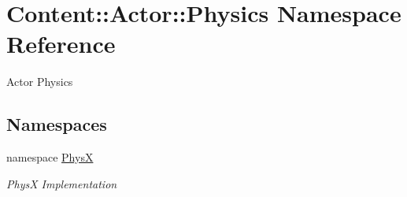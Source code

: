\hypertarget{namespaceContent_1_1Actor_1_1Physics}{
\section{Content::Actor::Physics Namespace Reference}
\label{namespaceContent_1_1Actor_1_1Physics}
}


Actor Physics  
\subsection*{Namespaces}
\begin{DoxyCompactItemize}
\item 
namespace \hyperlink{namespaceContent_1_1Actor_1_1Physics_1_1PhysX}{PhysX}


\begin{DoxyCompactList}\small\item\em PhysX Implementation \item\end{DoxyCompactList}\end{DoxyCompactItemize}
